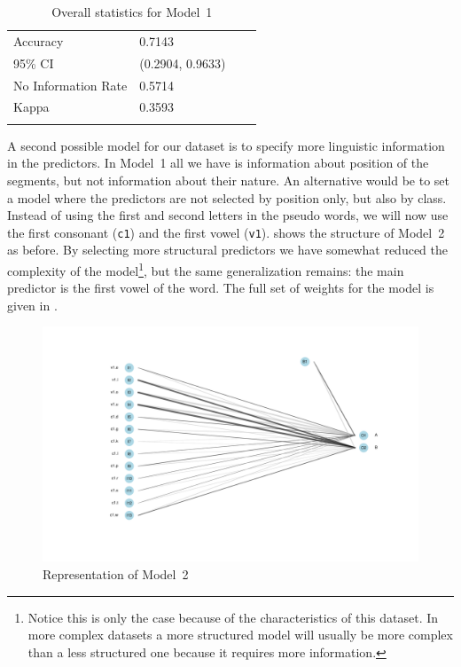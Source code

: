 \begin{table}%
  \centering
  \begin{tabular}{llrr}
    \lsptoprule
    \multicolumn{2}{c}{Overall statistics:} \\

    \midrule
    Accuracy            & 0.7143            \\
    95\% CI             & (0.2904, 0.9633)  \\
    No Information Rate & 0.5714            \\
    Kappa               & 0.3593            \\
    \lspbottomrule
  \end{tabular}
  \caption{Overall statistics for Model~1}\label{tab:stats-model1}
\end{table}

A second possible model for our dataset is to specify more linguistic information in the predictors. In Model~1 all we have is information about position of the segments, but not information about their nature. An alternative would be to set a model where the predictors are not selected by position only, but also by class. Instead of using the first and second letters in the pseudo words, we will now use the first consonant (\texttt{c1}) and the first vowel (\texttt{v1}).  shows the structure of Model~2 as before. By selecting more structural predictors we have somewhat reduced the complexity of the model\footnote{Notice this is only the case because of the characteristics of this dataset. In more complex datasets a more structured model will usually be more complex than a less structured one because it requires more information.}, but the same generalization remains: the main predictor is the first vowel of the word. The full set of weights for the model is given in .

\begin{figure}%
  \includegraphics[scale=0.45]{./figures/fake/model2.pdf}
  \caption{Representation of Model~2}\label{fig:model2}
\end{figure}

